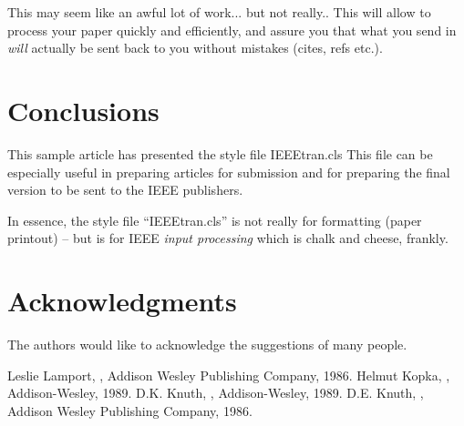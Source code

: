 \documentclass[journal,transmag]{IEEEtran}
\begin{document}
This may seem like an awful lot of work... but not really..
This will allow to process your paper quickly and efficiently, and assure
you
that what you send in {\em will\/} actually be sent back to you
without  mistakes (cites, refs etc.).

\section{Conclusions}
This sample article has presented the style file IEEEtran.cls
This file can be especially useful in preparing articles for
submission and for preparing the final version to be sent to the IEEE
publishers.

In essence, the style file ``IEEEtran.cls'' is not really for
formatting (paper printout) -- but is for IEEE {\em
input processing\/} which is chalk and cheese, frankly.


\section*{Acknowledgments}
The authors would like to acknowledge the suggestions of many people.


\nocite{*}



%
\begin{thebibliography}{1}
Leslie Lamport,
,
\newblock Addison Wesley Publishing Company, 1986.
Helmut Kopka,
,
\newblock Addison-Wesley, 1989.
D.K. Knuth,
,
\newblock Addison-Wesley, 1989.
D.E. Knuth,
,
\newblock Addison Wesley Publishing Company, 1986.
\end{thebibliography}
%
\end{document}
